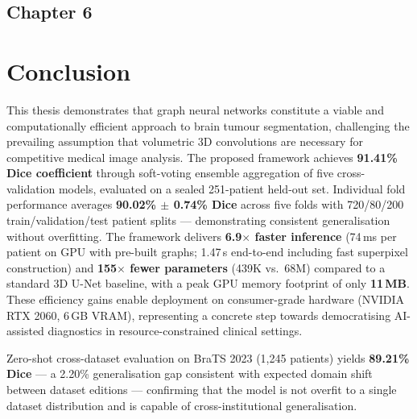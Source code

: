 \begin{center}
    \section*{\fontsize{20}{20}\selectfont Chapter 6}
\end{center}
\vspace{10mm}

\section{Conclusion}

This thesis demonstrates that graph neural networks constitute a viable and computationally efficient approach to brain tumour segmentation, challenging the prevailing assumption that volumetric 3D convolutions are necessary for competitive medical image analysis. The proposed framework achieves \textbf{91.41\% Dice coefficient} through soft-voting ensemble aggregation of five cross-validation models, evaluated on a sealed 251-patient held-out set. Individual fold performance averages \textbf{90.02\% $\pm$ 0.74\% Dice} across five folds with 720/80/200 train/validation/test patient splits — demonstrating consistent generalisation without overfitting. The framework delivers \textbf{6.9$\times$ faster inference} (74\,ms per patient on GPU with pre-built graphs; 1.47\,s end-to-end including fast superpixel construction) and \textbf{155$\times$ fewer parameters} (439K vs.\ 68M) compared to a standard 3D U-Net baseline, with a peak GPU memory footprint of only \textbf{11\,MB}. These efficiency gains enable deployment on consumer-grade hardware (NVIDIA RTX 2060, 6\,GB VRAM), representing a concrete step towards democratising AI-assisted diagnostics in resource-constrained clinical settings.

Zero-shot cross-dataset evaluation on BraTS 2023 (1,245 patients) yields \textbf{89.21\% Dice} — a 2.20\% generalisation gap consistent with expected domain shift between dataset editions — confirming that the model is not overfit to a single dataset distribution and is capable of cross-institutional generalisation.

